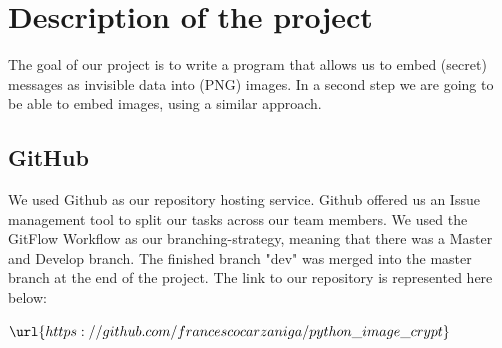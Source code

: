 \documentclass[
parskip=full,               %
12pt,                       %
twoside,                    %
a4paper                     %
]{article}
\begin{document}
\begin{titlepage}



 

\vfill %

\end{titlepage}	
	\section{Description of the project}
	The goal of our project is to write a program that allows us to embed (secret) 
	messages as invisible data into (PNG) images. In a second step we are going to be able to 
	embed images, using a similar approach. 

	\subsection{GitHub}
	We used Github as our repository hosting service. Github offered us an Issue management tool to
	split our tasks across our team members.
	We used the GitFlow Workflow as our branching-strategy, meaning that there was a Master and 
	Develop branch.  The finished branch "dev" was merged into the master branch at the end of the 	
	project.
	The link to our repository is represented here below: \newline
	\begin{center}
	$\url{https://github.com/francescocarzaniga/python\_image\_crypt}$
	\end{center}	 
\end{document}
